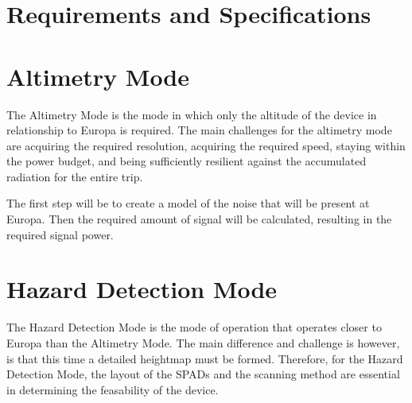 \documentclass[]{report}
\begin{document}
\chapter{Requirements and Specifications}\label{sec:requirements_and_specifications}

%






\chapter{Altimetry Mode}\label{sec:altimetry_mode}
The Altimetry Mode is the mode in which only the altitude of the device in relationship to Europa is required. The main challenges for the altimetry mode are acquiring the required resolution, acquiring the required speed, staying within the power budget, and being sufficiently resilient against the accumulated radiation for the entire trip.

The first step will be to create a model of the noise that will be present at Europa. Then the required amount of signal will be calculated, resulting in the required signal power. 



% 



%

\chapter{Hazard Detection Mode}\label{sec:hazard_detection_mode}
The Hazard Detection Mode is the mode of operation that operates closer to Europa than the Altimetry Mode. The main difference and challenge is however, is that this time a detailed heightmap must be formed. Therefore, for the Hazard Detection Mode, the layout of the SPADs and the scanning method are essential in determining the feasability of the device. 






\clearpage

\end{document}
